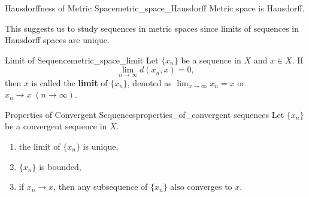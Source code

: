 \documentclass{report}
\begin{document}
\begin{proposition}{Hausdorffness of Metric Space}{metric_space_Hausdorff}
	Metric space is Hausdorff.
\end{proposition}
This suggests us to study sequences in metric spaces since limits of sequences in Hausdorff spaces are unique.
\begin{definition}{Limit of Sequence}{metric_space_limit}
	Let $\{x_n\}$ be a sequence in $X$ and $x\in X$. If
	\[
		\lim_{n\to\infty}d(x_n,x)=0,
	\]
	then $x$ is called the \textbf{limit} of $\{x_n\}$, denoted as $\lim_{x\to\infty}x_n=x$ or $x_n\to x\;(n\to\infty)$.
\end{definition}

\begin{proposition}{Properties of Convergent Sequences}{properties_of_convergent sequences}
	Let $\{x_n\}$ be a convergent sequence in $X$.
	\begin{enumerate}
		\item the limit of $\{x_n\}$ is unique,
		\item $\{x_n\}$ is bounded,
		\item if $x_n\to x$, then any subsequence of $\{x_n\}$ also converges to $x$.
	\end{enumerate}
\end{proposition}
\end{document}
